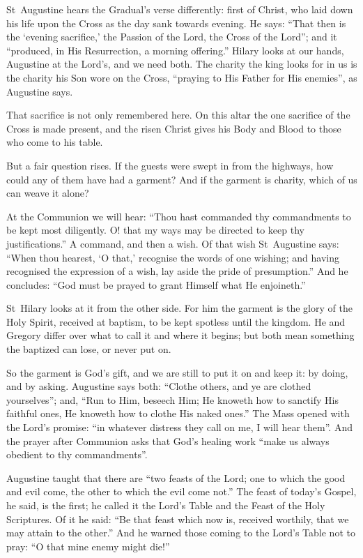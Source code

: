 \bigskip

St~Augustine hears the Gradual's verse differently: first of Christ, who laid down his
life upon the Cross as the day sank towards evening. He says: ``That then is
the `evening sacrifice,' the Passion of the Lord, the Cross of the Lord''; and
it ``produced, in His Resurrection, a morning offering.'' Hilary looks at our
hands, Augustine at the Lord's, and we need both. The charity the king looks
for in us is the charity his Son wore on the Cross, ``praying to His Father for
His enemies'', as Augustine says.

That sacrifice is not only remembered here. On this altar the one sacrifice of
the Cross is made present, and the risen Christ gives his Body and Blood to
those who come to his table.

\bigskip

But a fair question rises. If the guests were swept in from the highways, how
could any of them have had a garment? And if the garment is charity, which of
us can weave it alone?

At the Communion we will hear: ``Thou hast commanded thy commandments to be
kept most diligently. O! that my ways may be directed to keep thy
justifications.'' A command, and then a wish. Of that wish St~Augustine says:
``When thou hearest, `O that,' recognise the words of one wishing; and having
recognised the expression of a wish, lay aside the pride of presumption.'' And
he concludes: ``God must be prayed to grant Himself what He enjoineth.''

St~Hilary looks at it from the other side. For him the garment is the glory of
the Holy Spirit, received at baptism, to be kept spotless until the kingdom. He
and Gregory differ over what to call it and where it begins; but both mean
something the baptized can lose, or never put on.

So the garment is God's gift, and we are still to put it on and keep it: by
doing, and by asking. Augustine says both: ``Clothe others, and ye are clothed
yourselves''; and, ``Run to Him, beseech Him; He knoweth how to sanctify His
faithful ones, He knoweth how to clothe His naked ones.'' The Mass opened with
the Lord's promise: ``in whatever distress they call on me, I will hear them''.
And the prayer after Communion asks that God's healing work ``make us always
obedient to thy commandments''.

\bigskip

Augustine taught that there are ``two feasts of the Lord; one to which the good
and evil come, the other to which the evil come not.'' The feast of today's
Gospel, he said, is the first; he called it the Lord's Table and the Feast of
the Holy Scriptures. Of it he said: ``Be that feast which now is, received
worthily, that we may attain to the other.'' And he warned those coming to the
Lord's Table not to pray: ``O that mine enemy might die!''

